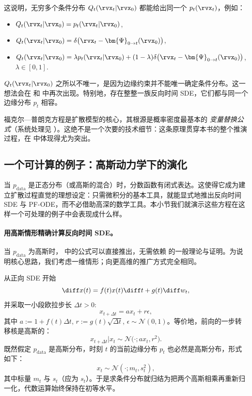 这说明，无穷多个条件分布 $Q_t(\rvx_t |\rvx_0)$ 都能给出同一个 $p_t(\rvx_t)$，例如：
\begin{itemize}
  \item {} $Q_t(\rvx_t |\rvx_0) = p_t(\rvx_t |\rvx_0)$,
  \item {} $Q_t(\rvx_t |\rvx_0) = \delta\bigl(\rvx_t - \bm{\Psi}_{0\to t}(\rvx_0)\bigr)$,
  \item {} $Q_t(\rvx_t |\rvx_0) = \lambda p_t(\rvx_t |\rvx_0) + (1-\lambda)\delta\bigl(\rvx_t - \bm{\Psi}_{0\to t}(\rvx_0)\bigr)$, $\lambda\in[0,1]$.
\end{itemize}
$Q_t(\rvx_t |\rvx_0)$ 之所以不唯一，是因为边缘约束并不能唯一确定条件分布。这一想法会在  和  中再次出现。特别地，存在整整一族反向时间 SDE，它们都与同一个边缘分布 $p_t$ 相容。

福克尔—普朗克方程是扩散模型的核心，其根源是概率密度最基本的 \emph{变量替换公式}（系统处理见 ）。这绝不是一个次要的技术细节：这条原理贯穿本书的整个推演过程，在  中体现得尤为突出。


\subsection{一个可计算的例子：高斯动力学下的演化}\label{subsec:example-gaussian}
当 $p_{\mathrm{data}}$ 是正态分布（或高斯的混合）时，分数函数有闭式表达。这使得它成为建立扩散过程直觉的理想设定：只需微积分的基本工具，就能显式地推出反向时间 SDE 与 PF-ODE，而不必借助高深的数学工具。本小节我们就演示这些方程在这样一个可处理的例子中会表现成什么样。


\paragraph{用高斯情形精确计算反向时间 SDE。}
当 $p_{\mathrm{data}}$ 为高斯时， 中的公式可以直接推出，无需依赖 \citet{anderson1982reverse} 的一般理论与证明。为说明核心思路，我们考虑一维情形；向更高维的推广方式完全相同。


从正向 SDE 开始
\[
\diff x(t)  =  f(t)  x(t)  \diff t  +  g(t)  \diff w_t,
\]
并采取一小段欧拉步长 $\Delta t>0$:
\[
x_{t+\Delta t}  =  a  x_t  +  r  \epsilon,
\]
其中 $a:=1+f(t)\Delta t$, $r:=g(t)\sqrt{\Delta t}$, $ \epsilon\sim\mathcal N(0,1)$。等价地，前向的一步转移核是高斯的：
\[
x_{t+\Delta t}   |   x_t  \sim  \mathcal N\!\big(\cdot;a  x_t,   r^2\big).
\]
既然假定 $p_{\mathrm{data}}$ 是高斯分布，时刻 $t$ 的当前边缘分布 $p_t$ 也必然是高斯分布，形式如下：
\[
x_t \sim \mathcal N(\cdot;m_t,   s_t^2),
\]
其中标量 $m_t$ 与 $s_t$（应为 $s_t$）。于是求条件分布就归结为把两个高斯相乘再重新归一化，代数运算始终保持在初等水平。

